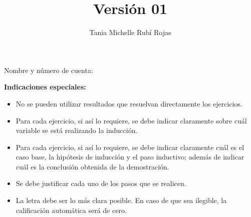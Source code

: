 \documentclass[oneside]{style}
\title{Versión 01}
\author{Tania Michelle Rubí Rojas}
\begin{document}
\maketitle

\vspace{2.5mm}
\noindent
Nombre y número de cuenta: \hrulefill\

\vspace{5mm}
\noindent
\textbf{Indicaciones especiales:}
{\small
\begin{multicols}{2}
\begin{itemize}
  \item No se pueden utilizar resultados que resuelvan directamente los 
  ejercicios. 

  \item Para cada ejercicio, si así lo requiere, se debe indicar claramente
  sobre cuál variable se está realizando la inducción. 

  \item Para cada ejercicio, si así lo requiere, se debe indicar claramente 
  cuál es el caso base, la hipótesis de inducción y el paso inductivo; 
  además de indicar cuál es la conclusión obtenida de la demostración. 

  \item Se debe justificar cada uno de los pasos que se realicen. 

  \item La letra debe ser lo más clara posible. En caso de que sea ilegible, 
  la calificación automática será de cero. 
\end{itemize}
\end{multicols}
}
\end{document}
